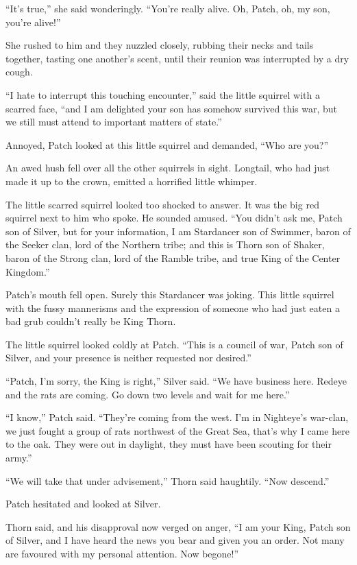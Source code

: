 \documentclass[ebook,oneside,openany,17pt]{memoir}
\begin{document}
“It’s true,” she said wonderingly. “You’re really alive. Oh, Patch,
oh, my son, you’re alive!”

She rushed to him and they nuzzled closely, rubbing their necks and
tails together, tasting one another’s scent, until their reunion was
interrupted by a dry cough.

“I hate to interrupt this touching encounter,” said the little
squirrel with a scarred face, “and I am delighted your son has somehow
survived this war, but we still must attend to important matters of
state.”

Annoyed, Patch looked at this little squirrel and demanded, “Who are
you?”

An awed hush fell over all the other squirrels in sight. Longtail, who
had just made it up to the crown, emitted a horrified little whimper.

The little scarred squirrel looked too shocked to answer. It was the
big red squirrel next to him who spoke. He sounded amused. “You didn’t
ask me, Patch son of Silver, but for your information, I am Stardancer
son of Swimmer, baron of the Seeker clan, lord of the Northern tribe;
and this is Thorn son of Shaker, baron of the Strong clan, lord of the
Ramble tribe, and true King of the Center Kingdom.”

Patch’s mouth fell open. Surely this Stardancer was joking. This
little squirrel with the fussy mannerisms and the expression of
someone who had just eaten a bad grub couldn’t really be King Thorn.

The little squirrel looked coldly at Patch. “This is a council of war,
Patch son of Silver, and your presence is neither requested nor
desired.”

“Patch, I’m sorry, the King is right,” Silver said. “We have business
here. Redeye and the rats are coming. Go down two levels and wait for
me here.”

“I know,” Patch said. “They’re coming from the west. I’m in Nighteye’s
war-clan, we just fought a group of rats northwest of the Great Sea,
that’s why I came here to the oak. They were out in daylight, they
must have been scouting for their army.”

“We will take that under advisement,” Thorn said haughtily. “Now
descend.”

Patch hesitated and looked at Silver.

Thorn said, and his disapproval now verged on anger, “I am your King,
Patch son of Silver, and I have heard the news you bear and given you
an order. Not many are favoured with my personal attention. Now
begone!”
\end{document}
